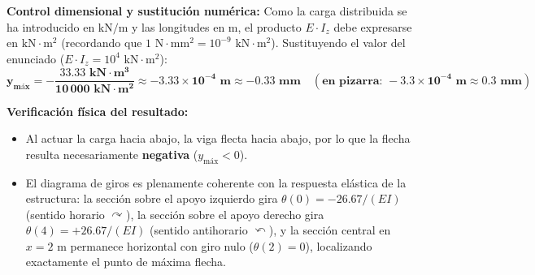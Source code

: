 {    \begin{comprobacion}
        \textbf{Control dimensional y sustitución numérica:}
        Como la carga distribuida se ha introducido en $\text{kN/m}$ y las longitudes en $\text{m}$, el producto $E \cdot I_z$ debe expresarse en $\text{kN}\cdot\text{m}^2$ (recordando que $1\text{ N}\cdot\text{mm}^2 = 10^{-9}\text{ kN}\cdot\text{m}^2$). Sustituyendo el valor del enunciado ($E \cdot I_z = 10^4\text{ kN}\cdot\text{m}^2$):
        \begin{equation}
            \mathbf{y_{\text{máx}} = -\frac{33.33\text{ kN}\cdot\text{m}^3}{10\,000\text{ kN}\cdot\text{m}^2} \approx -3.33 \times 10^{-4}\text{ m} \approx -0.33\text{ mm} \quad (\text{en pizarra: } -3.3 \times 10^{-4}\text{ m} \approx 0.3\text{ mm})}
        \end{equation}

        \textbf{Verificación física del resultado:}
        \begin{itemize}
            \item Al actuar la carga hacia abajo, la viga flecta hacia abajo, por lo que la flecha resulta necesariamente \textbf{negativa} ($y_{\text{máx}} < 0$).
            \item El diagrama de giros es plenamente coherente con la respuesta elástica de la estructura: la sección sobre el apoyo izquierdo gira $\theta(0) = -26.67/(EI)$ (sentido horario $\curvearrowright$), la sección sobre el apoyo derecho gira $\theta(4) = +26.67/(EI)$ (sentido antihorario $\curvearrowleft$), y la sección central en $x = 2\text{ m}$ permanece horizontal con giro nulo ($\theta(2) = 0$), localizando exactamente el punto de máxima flecha.
        \end{itemize}
    \end{comprobacion}
}

